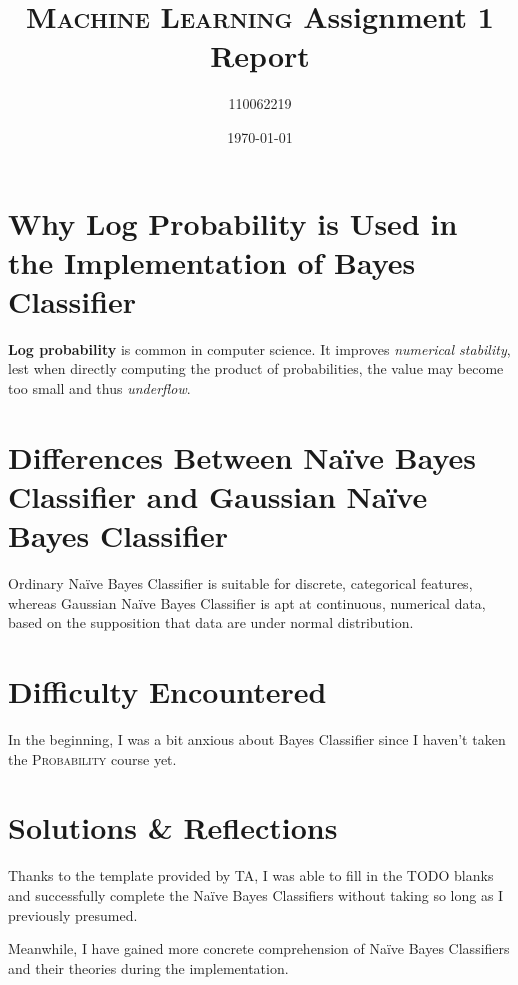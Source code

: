 \documentclass[12pt, a4paper]{article}
\title{\textsc{Machine Learning} Assignment 1 Report}
\author{110062219}
\date{\today}
\begin{document}
\maketitle

\section{Why Log Probability is Used in the Implementation of Bayes Classifier}

\textbf{Log probability} is common in computer science. It improves \textit{numerical stability}, lest when directly computing the product of probabilities, the value may become too small and thus \textit{underflow}.

\section{Differences Between Na\"{i}ve Bayes Classifier and Gaussian Na\"{i}ve Bayes Classifier}

Ordinary Na\"{i}ve Bayes Classifier is suitable for discrete, categorical features, whereas Gaussian Na\"{i}ve Bayes Classifier is apt at continuous, numerical data, based on the supposition that data are under normal distribution.

\section{Difficulty Encountered}

In the beginning, I was a bit anxious about Bayes Classifier since I haven't taken the \textsc{Probability} course yet.

\section{Solutions \& Reflections}

Thanks to the template provided by TA, I was able to fill in the TODO blanks and successfully complete the Na\"{i}ve Bayes Classifiers without taking so long as I previously presumed.

Meanwhile, I have gained more concrete comprehension of Na\"{i}ve Bayes Classifiers and their theories during the implementation.

%
\end{document}
